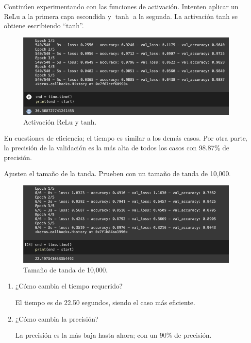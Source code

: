 \begin{problema}
	Continúen experimentando con las funciones de activación.  Intenten aplicar un ReLu a la primera capa escondida y $\tanh$ a la segunda.  La activación tanh se obtiene escribiendo “tanh”.
		\begin{figure}[H]
		\centering
		\includegraphics[scale=0.5]{Images/6.png}
		\caption{Activación ReLu y tanh.}
	\end{figure}
	\begin{sol}
	 En cuestiones de eficiencia; el tiempo es similar a los demás casos. Por otra parte, la precisión de la validación es la más alta de todos los casos con 98.87\% de precisión. 
	\end{sol}
\end{problema}
\begin{problema}
	Ajusten el tamaño de la tanda.  Prueben con un tamaño de tanda de 10,000.  
		\begin{figure}[H]
		\centering
		\includegraphics[scale=0.5]{Images/7.png}
		\caption{Tamaño de tanda de 10,000.}
	\end{figure}
	
	\begin{enumerate}
		\item ¿Cómo cambia el tiempo requerido?
		\begin{sol}
			El tiempo es de 22.50 segundos, siendo el caso más eficiente. 
		\end{sol}
		\item ¿Cómo cambia la precisión?
		\begin{sol}
			La precisión es la más baja hasta ahora; con un 90\% de precisión.		\end{sol}
	\end{enumerate}
\end{problema}
